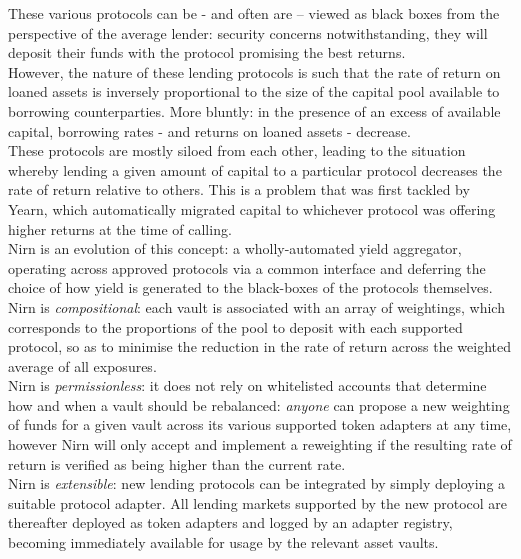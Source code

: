 \documentclass{article}
\begin{document}
\noindent
These various protocols can be - and often are -- viewed as black boxes from the perspective of the average lender: security concerns notwithstanding, they will deposit their funds with the protocol promising the best returns.\\

\noindent
However, the nature of these lending protocols is such that the rate of return on loaned assets is inversely proportional to the size of the capital pool available to borrowing counterparties. More bluntly: in the presence of an excess of available capital, borrowing rates  - and returns on loaned assets - decrease.\\

\noindent
These protocols are mostly siloed from each other, leading to the situation whereby lending a given amount of capital to a particular protocol decreases the rate of return relative to others. This is a problem that was first tackled by Yearn, which automatically migrated capital to whichever protocol was offering higher returns at the time of calling.\\

\noindent
Nirn is an evolution of this concept: a wholly-automated  yield aggregator, operating across approved protocols via a common interface and deferring the choice of how yield is generated to the black-boxes of the protocols themselves.\\

\noindent
Nirn is \textit{compositional}: each vault is associated with an array of weightings, which corresponds to the proportions of the pool to deposit with each supported protocol, so as to minimise the reduction in the rate of return across the weighted average of all exposures.\\

\noindent
Nirn is \textit{permissionless}: it does not rely on whitelisted accounts that determine how and when a vault should be rebalanced: \textit{anyone} can propose a new weighting of funds for a given vault across its various supported token adapters at any time, however Nirn will only accept and implement a reweighting if the resulting rate of return is verified as being higher than the current rate.\\

\noindent
Nirn is \textit{extensible}: new lending protocols can be integrated by simply deploying a suitable protocol adapter. All lending markets supported by the new protocol are thereafter deployed as token adapters and logged by an adapter registry, becoming immediately available for usage by the relevant asset vaults.
\end{document}
